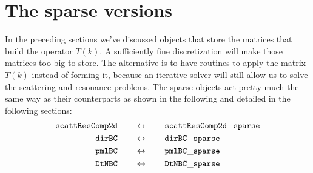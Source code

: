 \section{The sparse versions}
\label{sec-scattering_sparse}

In the preceding sections we've discussed objects that 
store the matrices that build the operator $T(k)$. 
A sufficiently fine discretization will make those
matrices too big to store. The alternative is to 
have routines to apply the matrix $T(k)$ instead of 
forming it, because an iterative solver will still
allow us to solve the scattering and resonance problems.
The sparse objects act pretty much the same way as their
counterparts as shown in the following and detailed
in the following sections:
\begin{equation}
\begin{aligned}
 {\tt scattResComp2d} 
 &\qquad\leftrightarrow\qquad
 {\tt scattResComp2d\_sparse} \\ 
 {\tt dirBC}
 &\qquad\leftrightarrow\qquad
 {\tt dirBC\_sparse} \\ 
 {\tt pmlBC}
 &\qquad\leftrightarrow\qquad
 {\tt pmlBC\_sparse} \\ 
 {\tt DtNBC}
 &\qquad\leftrightarrow\qquad
 {\tt DtNBC\_sparse}
\end{aligned}
\end{equation}


